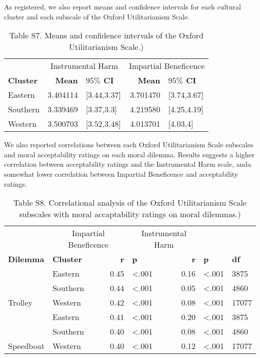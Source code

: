 \documentclass[
]{article}
\begin{document}
As registered, we also report means and confidence intervals for each
cultural cluster and each subscale of the Oxford Utilitarianism Scale.

\begin{table}[H]

\caption{\label{tab:OUS means + CI}Table S7. Means and confidence intervals of the Oxford Utilitarianism Scale.)}
\begin{tabular}[t]{lrlrl}
\toprule
\multicolumn{1}{c}{ } & \multicolumn{2}{c}{Instrumental Harm} & \multicolumn{2}{c}{Impartial Beneficence} \\
\cmidrule(l{3pt}r{3pt}){2-3} \cmidrule(l{3pt}r{3pt}){4-5}
\textbf{Cluster} & \textbf{Mean} & \textbf{$95\%$ CI} & \textbf{Mean} & \textbf{$95\%$ CI}\\
\midrule
Eastern & 3.404114 & {}[3.44,3.37] & 3.701470 & {}[3.74,3.67]\\
Southern & 3.339469 & {}[3.37,3.3] & 4.219580 & {}[4.25,4.19]\\
Western & 3.500703 & {}[3.52,3.48] & 4.013701 & {}[4.03,4]\\
\bottomrule
\end{tabular}
\end{table}

We also reported correlations between each Oxford Utilitarianism Scale
subscales and moral acceptability ratings on each moral dilemma. Results
suggests a higher correlation between acceptability ratings and the
Instrumental Harm scale, anda somewhat lower correlation between
Impartial Beneficence and acceptability ratings.

\begin{table}[H]

\caption{\label{tab:OUS correlations}Table S8. Correlational analysis of the Oxford Utilitarianism Scale subscales with moral accaptability ratings on moral dilemmas.)}
\begin{tabular}[t]{llrlrll}
\toprule
\multicolumn{1}{c}{ } & \multicolumn{2}{c}{Impartial Beneficence} & \multicolumn{2}{c}{Instrumental Harm} & \multicolumn{1}{c}{ } \\
\cmidrule(l{3pt}r{3pt}){2-3} \cmidrule(l{3pt}r{3pt}){4-5}
\textbf{Dilemma} & \textbf{Cluster} & \textbf{r} & \textbf{p} & \textbf{r} & \textbf{p} & \textbf{df}\\
\midrule
 & Eastern & 0.45 & <.001 & 0.16 & <.001 & 3875\\

 & Southern & 0.44 & <.001 & 0.05 & <.001 & 4860\\

\multirow[t]{-3}{*}{\raggedright\arraybackslash Trolley} & Western & 0.42 & <.001 & 0.08 & <.001 & 17077\\
\cmidrule{1-7}
 & Eastern & 0.41 & <.001 & 0.20 & <.001 & 3875\\

 & Southern & 0.40 & <.001 & 0.08 & <.001 & 4860\\

\multirow[t]{-3}{*}{\raggedright\arraybackslash Speedboat} & Western & 0.40 & <.001 & 0.12 & <.001 & 17077\\
\bottomrule
\end{tabular}
\end{table}
\end{document}
